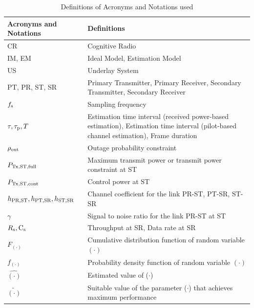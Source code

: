 \begin{table}
\vspace{\tmara}
\renewcommand{\arraystretch}{\tablespacing}
\caption{Definitions of Acronyms and Notations used}
\vspace{\tmarb}
\label{tb:tb1}
\centering
\scriptsize{
\begin{tabular}{p{}||p{}}
\hline
\bfseries Acronyms and Notations & \bfseries Definitions \\
\hline\hline
CR & Cognitive Radio\\ \hline
IM, EM & Ideal Model, Estimation Model \\ \hline
US & Underlay System \\ \hline
PT, PR, ST, SR & Primary Transmitter, Primary Receiver, Secondary Transmitter, Secondary Receiver \\ \hline
$f_{\text{s}}$ & Sampling frequency\\ \hline
$\tau, \tau_{\text{p}}, T$ & Estimation time interval (received power-based estimation), Estimation time interval (pilot-based channel estimation), Frame duration\\ \hline
$\rho_{\text{out}}$ & Outage probability constraint \\ \hline
$P_{\text{Tx,ST,full}}$ & Maximum transmit power or transmit power constraint at ST \\ \hline
$P_{\text{Tx,ST,cont}}$ & Control power at ST \\ \hline
$h_{\text{PR,ST}}, h_{\text{PT,SR}}, h_{\text{ST,SR}}$ & Channel coefficient for the link PR-ST, PT-SR, ST-SR \\ \hline
$\gamma$ & Signal to noise ratio for the link PR-ST at ST \\ \hline
$R_{\text{s}}, \text{C}_{\text{s}}$ & Throughput at SR, Data rate at SR \\ \hline
$F_{(\cdot)}$ & Cumulative distribution function of random variable $(\cdot)$\\ \hline
$f_{(\cdot)}$ & Probability density function of random variable $(\cdot)$\\ \hline
$\hat{(\cdot)}$ & Estimated value of ($\cdot$)\\ \hline
$\tilde{(\cdot)}$ & Suitable value of the parameter ($\cdot$) that achieves maximum performance \\ \hline

\end{tabular}}
\end{table}
